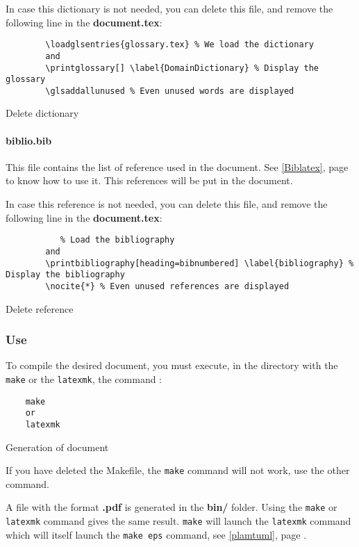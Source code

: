 In case this dictionary is not needed, you can delete this file, and remove the following line in
the \textbf{document.tex}:
\begin{code}
    \begin{verbatim}
        \loadglsentries{glossary.tex} % We load the dictionary
        and
        \printglossary[] \label{DomainDictionary} % Display the glossary
        \glsaddallunused % Even unused words are displayed
    \end{verbatim}
    \caption{Delete dictionary}
\end{code}

\paragraph{biblio.bib}
This file contains the list of reference used in the document. See \ref{Biblatex}, page
\pageref{Biblatex} to know how to use it.
This references will be put in the document.\newline

In case this reference is not needed, you can delete this file, and remove the following line in the
\textbf{document.tex}:
\begin{code}
    \begin{verbatim}
           % Load the bibliography
        and
        \printbibliography[heading=bibnumbered] \label{bibliography} % Display the bibliography
        \nocite{*} % Even unused references are displayed
    \end{verbatim}
    \caption{Delete reference}
\end{code}

\subsubsection{Use} \label{use}
To compile the desired document, you must execute, in the directory with the \texttt{make}
or the \texttt{latexmk}, the command :
\begin{code}
    \begin{verbatim}
    make
    or
    latexmk
\end{verbatim}
    \caption{Generation of document}
\end{code}

If you have deleted the Makefile, the \texttt{make} command will not work, use the other
command.\newline

A file with the format \textbf{.pdf} is generated in the \textbf{bin/} folder. Using the
\texttt{make} or \texttt{latexmk} command gives the same result.
\texttt{make} will launch the \texttt{latexmk} command which will itself launch
the \texttt{make eps} command, see \ref{plamtuml}, page \pageref{plamtuml}.\newline

